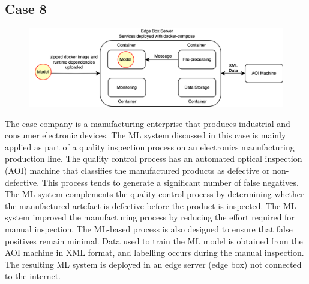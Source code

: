 \subsection*{Case 8} %
\label{case: 8}

\DIFaddbegin \begin{figure}[b]
\centering
\includegraphics[width=\linewidth]{images/case8_deployment_process.png}
\caption{}
\label{fig: case8_deployment_process}
\end{figure}

\DIFaddend %
\DIFdelbegin %

{%
}
\DIFdelend 

The case company is a manufacturing enterprise that produces industrial and consumer electronic devices. The ML system discussed in this case is mainly applied as part of a quality inspection process on an electronics manufacturing production line. The quality control process has an automated optical inspection (AOI) machine that classifies the manufactured products as defective or non-defective. This process tends to generate a significant number of false negatives. The ML system complements the quality control process by determining whether the manufactured artefact is defective before the product is inspected. The ML system improved the manufacturing process by reducing the effort required for manual inspection. The ML-based process is also designed to ensure that false positives remain minimal. Data used to train the ML model is obtained from the AOI machine in XML format, and labelling occurs during the manual inspection. The resulting ML system is deployed in an edge server (edge box) not connected to the internet.

